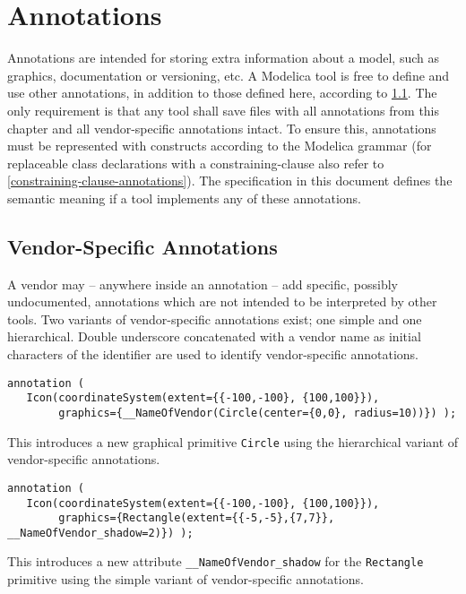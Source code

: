 \chapter{Annotations}\label{annotations}

Annotations are intended for storing extra information about a model,
such as graphics, documentation or versioning, etc. A Modelica tool is
free to define and use other annotations, in addition to those defined
here, according to \cref{vendor-specific-annotations}. The only requirement is that any tool
shall save files with all annotations from this chapter and all
vendor-specific annotations intact. To ensure this, annotations must be
represented with constructs according to the Modelica grammar (for
replaceable class declarations with a constraining-clause also refer to
\cref{constraining-clause-annotations}). The specification in this document defines the
semantic meaning if a tool implements any of these annotations.

\section{Vendor-Specific Annotations}\label{vendor-specific-annotations}

A vendor may -- anywhere inside an annotation -- add specific, possibly
undocumented, annotations which are not intended to be interpreted by
other tools. Two variants of vendor-specific annotations exist; one
simple and one hierarchical. Double underscore concatenated with a
vendor name as initial characters of the identifier are used to identify
vendor-specific annotations.

\begin{example}
\begin{lstlisting}[language=modelica]
annotation (
   Icon(coordinateSystem(extent={{-100,-100}, {100,100}}),
        graphics={__NameOfVendor(Circle(center={0,0}, radius=10))}) );
\end{lstlisting}
This introduces a new graphical primitive \lstinline!Circle! using the
hierarchical variant of vendor-specific annotations.
\begin{lstlisting}[language=modelica]
annotation (
   Icon(coordinateSystem(extent={{-100,-100}, {100,100}}),
        graphics={Rectangle(extent={{-5,-5},{7,7}}, __NameOfVendor_shadow=2)}) );
\end{lstlisting}
This introduces a new attribute \lstinline!__NameOfVendor_shadow!
for the \lstinline!Rectangle! primitive using the simple variant of
vendor-specific annotations.
\end{example}

